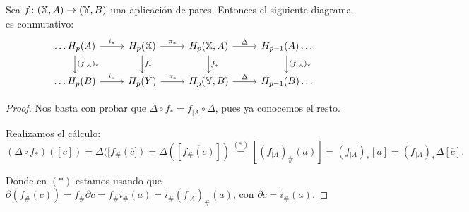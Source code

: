 \begin{proposition}
  Sea $f \colon ({\mathbb X}, A) \to ({\mathbb Y}, B)$ una aplicación de pares. Entonces el siguiente diagrama es conmutativo:
  \[  \begin{tikzcd}
    \dots H_p(A) \arrow{r}{i_*} \arrow{d}{(f_{|A})_*} & H_p(\X) \arrow{r}{\pi_*} \arrow{d}{f_*} & H_p(\X, A) \arrow{r}{\Delta} \arrow{d}{f_*} & H_{p-1}(A) \dots \arrow{d}{(f_{|A})_*} \\
    \dots H_p(B) \arrow{r}{i_*} & H_p(Y) \arrow{r}{\pi_*} & H_p(\Y, B) \arrow{r}{\Delta} & H_{p-1}(B) \dots
  \end{tikzcd} \]
\end{proposition}

\begin{proof}
  Nos basta con probar que $\Delta \circ f_* = f_{|A} \circ \Delta$, pues ya conocemos el resto.

  Realizamos el cálculo:
  \[ (\Delta \circ f_*)([c]) = \Delta([f_\#(\overline{c}]) = \Delta([\overline{f_\#(c)}]) \stackrel{(*)}{=} [(f_{|A})_\#(a)]
    = (f_{|A})_*[a] = (f_{|A})_* \Delta[\overline{c}]. \]

  Donde en $(*)$ estamos usando que $\partial(f_\#(c)) = f_\# \partial c = f_\# i_\#(a) = i_\#(f_{|A})_\#(a)$, con $\partial c = i_\#(a).$
\end{proof}
